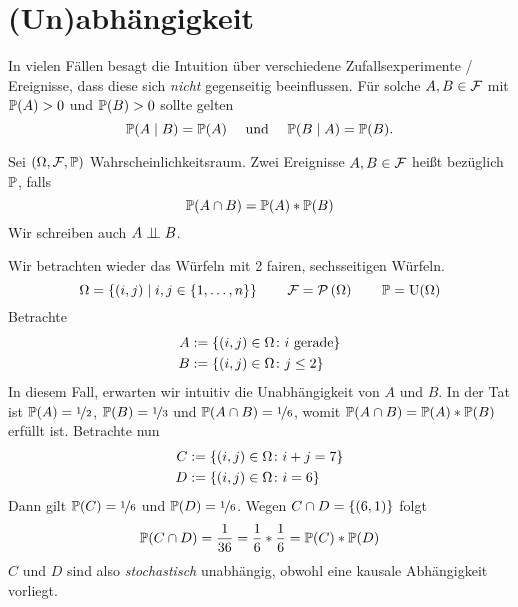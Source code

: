 \section{(Un)abhängigkeit} \label{sec: unabhaengigkeit}
In vielen Fällen besagt die Intuition über verschiedene Zufallsexperimente / Ereignisse, dass diese sich \textit{nicht} gegenseitig beeinflussen. Für solche $A,B \in \F$ mit $\P(A) > 0$ und $\P(B) > 0$ sollte gelten
\begin{equation*}
	\P(A\mid B) = \P(A) \quad \und \quad \P(B\mid A) = \P(B).
\end{equation*}

\begin{definition} \label{def: 3_2_11}
	Sei $(\Omega, \F, \P)$ Wahrscheinlichkeitsraum. Zwei Ereignisse $A,B \in \F$ heißt  bezüglich $\P$, falls
	\begin{equation*}
		\P(A\cap B) = \P(A) * \P(B)
	\end{equation*}
	Wir schreiben auch $A \upmodels B$.
\end{definition}

\begin{beispiel}
	Wir betrachten wieder das Würfeln mit 2 fairen, sechsseitigen Würfeln. 
	\begin{equation*}
		\Omega = \menge{(i,j) \mid i,j \in\menge{1,\dots,n}} \qquad 
		\F = \pows\Omega \qquad 
		\P = \Uni(\Omega)
	\end{equation*}
	Betrachte
	\begin{equation*}
	\begin{aligned}
		A &\defeq \menge{(i,j) \in \Omega \colon i \text{ gerade}}\\
		B &\defeq \menge{(i,j) \in \Omega \colon j \leq 2}
	\end{aligned}
	\end{equation*}
	In diesem Fall, erwarten wir intuitiv die Unabhängigkeit von $A$ und $B$.
	In der Tat ist $\P(A) = \lfrac{1}{2}$, $\P(B) = \lfrac{1}{3}$ und $\P(A\cap B) = \lfrac{1}{6}$, womit $\P(A \cap B) = \P(A) * \P(B)$ erfüllt ist.
	Betrachte nun
	\begin{equation*}
	\begin{aligned}
		C &\defeq \menge{(i,j) \in \Omega \colon i + j = 7}\\
		D &\defeq \menge{(i,j) \in \Omega \colon i = 6}
	\end{aligned}
	\end{equation*}
	Dann gilt $\P(C) = \lfrac{1}{6}$ und $\P(D) = \lfrac{1}{6}$. Wegen $C \cap D = \menge{(6,1)}$ folgt
	\begin{equation*}
		\P(C\cap D) = \frac{1}{36} = \frac{1}{6} * \frac{1}{6} = \P(C) * \P(D)
	\end{equation*}
	$C$ und $D$ sind also \textit{stochastisch} unabhängig, obwohl eine kausale Abhängigkeit vorliegt.
\end{beispiel}

